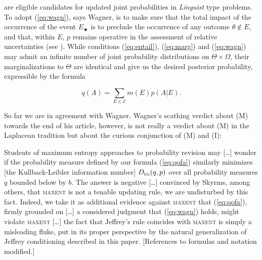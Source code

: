 \documentclass[11pt]{article}
\begin{document}
are eligible candidates for updated joint probabilities in
\emph{Linguist} type problems. 
To adopt (\ref{eq:wagn}), says Wagner, is to make sure
that the total impact of the occurrence of the event $E_{\bigstar}$ is
to preclude the occurrence of any outcome $\theta\notin{}E$, and that,
within $E$, $p$ remains operative in the assessment of relative
uncertainties (see ). While conditions
(\ref{eq:entail}), (\ref{eq:marg}) and (\ref{eq:wagn}) may admit an
infinite number of joint probability distributions on
$\Theta\times\Omega$, their marginalizations to $\Theta$ are identical
and give us the desired posterior probability, expressible by the
formula

\begin{equation}
  \label{eq:qofa}
  q(A)=\sum_{E\in\mathcal{E}}m(E)p(A|E).
\end{equation}


So far we are in agreement with Wagner. Wagner's scathing verdict
about (M) towards the end of his article, however, is not really a
verdict about (M) in the Laplacean tradition but about the curious
conjunction of (M) and (I):

\begin{quotex}
  Students of maximum entropy approaches to probability revision may
  [\ldots] wonder if the probability measure defined by our formula
  (\ref{eq:qofa}) similarly minimizes [the Kullback-Leibler
  information number] $D_{\textsc{kl}}(q,p)$ over all probability
  measures $q$ bounded below by $b$. The answer is negative [\ldots]
  convinced by Skyrms, among others, that \textsc{maxent} is not a
  tenable updating rule, we are undisturbed by this fact. Indeed, we
  take it as additional evidence against \textsc{maxent} that
  (\ref{eq:qofa}), firmly grounded on [\ldots] a considered judgment
  that (\ref{eq:wagn}) holds, might violate \textsc{maxent} [\ldots]
  the fact that Jeffrey's rule coincides with \textsc{maxent} is
  simply a misleading fluke, put in its proper perspective by the
  natural generalization of Jeffrey conditioning described in
  this paper. [References to formulas and notation modified.]
\end{quotex}
\end{document}
